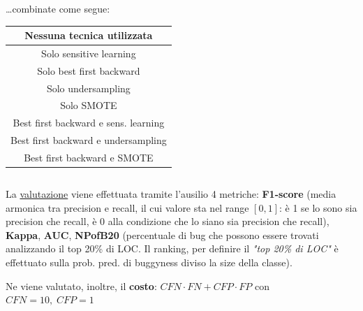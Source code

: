\documentclass{beamer}
\newcommand{\dflvspace}{\vspace{10pt}}
\begin{document}
\begin{frame}
\begin{columns}[T]
		\begin{column}{0.5\linewidth}
		\dots combinate come segue:
		\begin{tabular}{|c|}
			\hline
			Nessuna tecnica utilizzata\\
			\hline
			Solo sensitive learning\\
			\hline
			Solo best first backward\\
			\hline
			Solo undersampling\\
			\hline 
			Solo SMOTE\\
			\hline
			Best first backward e sens. learning\\
			\hline
			Best first backward e undersampling\\
			\hline
			Best first backward e SMOTE\\
			\hline
		\end{tabular}
		\end{column}
	\end{columns}
	\dflvspace
	La \underline{valutazione} viene effettuata tramite l'ausilio 4 metriche: 
	\textbf{F1-score} 
	(media armonica tra precision e recall, il cui valore sta nel range $[0,1]$: 
	è 1 se lo sono sia precision che recall, è 0 alla condizione che lo siano sia precision che recall),
	\textbf{Kappa}, \textbf{AUC}, 
	\textbf{NPofB20} (percentuale di bug che
	possono essere trovati analizzando il top 20\% di LOC. Il ranking, per definire
	il \textit{"top 20\% di LOC"}
	è effettuato sulla prob. pred. di buggyness diviso la size della classe).
	
	Ne viene valutato, inoltre, il \textbf{costo}: $CFN \cdot FN + CFP \cdot FP$ con
	$CFN=10,\;CFP=1$
\end{frame}
\end{document}
